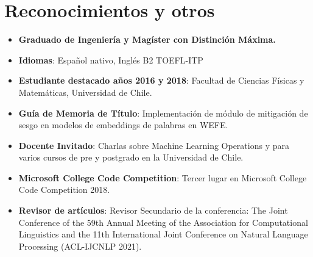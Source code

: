 \documentclass[letterpaper,11pt]{article}
\newcommand{\resumeItem}[2]{
  \item\small{
    \textbf{#1}{: #2\vspace{-2pt}}
  }
}
\newcommand{\resumeSubItem}[2]{\resumeItem{#1}{#2}\vspace{-4pt}}
\newcommand{\resumeItemNoColon}[2]{
  \item\small{
    \textbf{#1}{ #2\vspace{-2pt}}
  }
}
\newcommand{\resumeSubItemNoColon}[2]{\resumeItemNoColon{#1}{#2}\vspace{-4pt}}
\newcommand{\resumeSubHeadingListStart}{\begin{itemize}[leftmargin=*]}
\newcommand{\resumeSubHeadingListEnd}{\end{itemize}}
\begin{document}
\section{Reconocimientos y otros}
  \resumeSubHeadingListStart
    \resumeSubItemNoColon{Graduado de Ingeniería y Magíster con Distinción Máxima.}{}
    \resumeSubItem{Idiomas}
      {Español nativo, Inglés B2 TOEFL-ITP}
    \resumeSubItem{Estudiante destacado años 2016 y 2018}
      {Facultad de Ciencias Físicas y Matemáticas, Universidad de Chile.}
    \resumeSubItem{Guía de Memoria de Título}
      {Implementación de módulo de mitigación de sesgo en modelos de embeddings de palabras en WEFE.}
    \resumeSubItem{Docente Invitado}
      {Charlas sobre Machine Learning Operations y para varios cursos de pre y postgrado en la Universidad de Chile.}
    \resumeSubItem{Microsoft College Code Competition}
      {Tercer lugar en Microsoft College Code Competition 2018.}
    \resumeSubItem{Revisor de artículos}
      {Revisor Secundario de la conferencia: The Joint Conference of the 59th Annual Meeting of the Association for Computational Linguistics and the 11th International Joint Conference on Natural Language Processing (ACL-IJCNLP 2021).}
  \resumeSubHeadingListEnd

\end{document}

